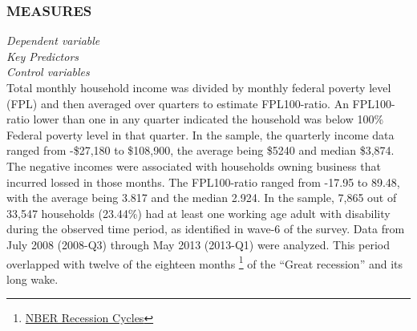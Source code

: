 \documentclass[11pt]{extarticle} %
\begin{document}
\subsubsection*{MEASURES}
\noindent
{\emph{Dependent variable}}\\

\noindent
{\emph{Key Predictors}}\\

\noindent
{\emph{Control variables}}\\

Total monthly household income was divided by monthly federal poverty level (FPL) and then averaged over quarters to estimate FPL100-ratio. An FPL100-ratio lower than one in any quarter indicated the household was below 100\% Federal poverty level in that quarter. In the sample, the quarterly income data ranged from -\$27,180 to \$108,900, the average being \$5240 and median \$3,874. The negative incomes were associated with households owning business that incurred lossed in those months. The FPL100-ratio ranged from -17.95 to 89.48, with the average being 3.817 and the median 2.924. In the sample, 7,865 out of 33,547 households (23.44\%) had at least one working age adult with disability during the observed time period, as identified in wave-6 of the survey. Data from July 2008 (2008-Q3) through May 2013 (2013-Q1) were analyzed. This period overlapped with twelve of the eighteen months {\footnote{\href{http://www.nber.org/cycles/}{NBER Recession Cycles}}} of the ``Great recession'' and its long wake. 
\end{document}
